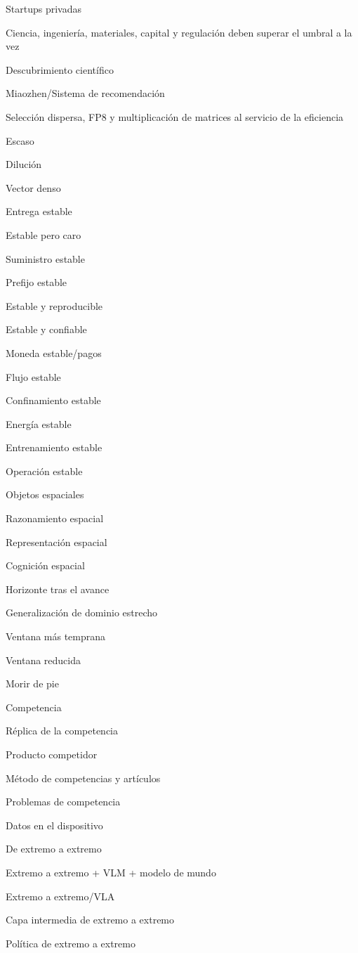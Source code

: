 \documentclass{article}
\begin{document}
Startups privadas

Ciencia, ingeniería, materiales, capital y regulación deben superar el umbral a la vez

Descubrimiento científico

Miaozhen/Sistema de recomendación

Selección dispersa, FP8 y multiplicación de matrices al servicio de la eficiencia

Escaso

Dilución

Vector denso

Entrega estable

Estable pero caro

Suministro estable

Prefijo estable

Estable y reproducible

Estable y confiable

Moneda estable/pagos

Flujo estable

Confinamiento estable

Energía estable

Entrenamiento estable

Operación estable

Objetos espaciales

Razonamiento espacial

Representación espacial

Cognición espacial

Horizonte tras el avance

Generalización de dominio estrecho

Ventana más temprana

Ventana reducida

Morir de pie

Competencia

Réplica de la competencia

Producto competidor

Método de competencias y artículos

Problemas de competencia

Datos en el dispositivo

De extremo a extremo

Extremo a extremo + VLM + modelo de mundo

Extremo a extremo/VLA

Capa intermedia de extremo a extremo

Política de extremo a extremo
\end{document}
